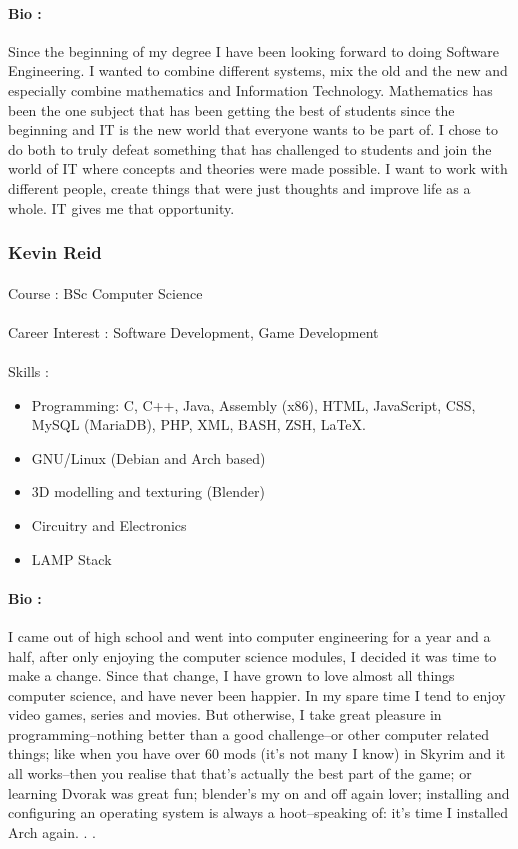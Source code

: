 \documentclass[11pt]{article}
\begin{document}
\paragraph{Bio :} Since the beginning of my degree I have been looking forward to doing 
Software Engineering. I wanted to combine different systems, mix the old 
and the new and especially combine mathematics and Information 
Technology. Mathematics has been the one subject that has been getting 
the best of students since the beginning and IT is the new world that 
everyone wants to be part of. I chose to do both to truly defeat something 
that has challenged to students and join the world of IT where concepts 
and theories were made possible. I want to work with different people, 
create things that were just thoughts and improve life as a whole. IT gives 
me that opportunity.

\subsubsection{Kevin Reid}
\paragraph{}Course : BSc Computer Science
\paragraph{}Career Interest : Software Development, Game Development
\paragraph{}Skills : 
\begin{itemize}
\item Programming: C, C++, Java, Assembly (x86), HTML, JavaScript, CSS, MySQL (MariaDB), PHP, XML, BASH, ZSH, LaTeX.
\item GNU/Linux (Debian and Arch based)
\item 3D modelling and texturing (Blender)
\item Circuitry and Electronics
\item LAMP Stack
\end{itemize}
\paragraph{Bio :} I came out of high school and went into computer engineering for a year and a half, after only enjoying the computer science modules, I decided it was time to make a change. Since that change, I have grown to love almost all things computer science, and have never been happier.
In my spare time I tend to enjoy video games, series and movies. But otherwise, I take great pleasure in programming--nothing better than a good challenge--or other computer related things; like when you have over 60 mods (it's not many I know) in Skyrim and it all works--then you realise that that's actually the best part of the game; or learning Dvorak was great fun; blender's my on and off again lover; installing and configuring an operating system is always a hoot--speaking of: it's time I installed Arch again. . .
\end{document}

